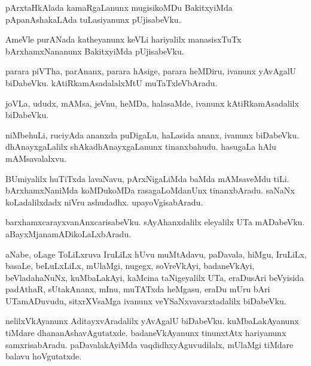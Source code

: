 \begin{mng}
pArxtaHkAlada kamaRgaLanunx mugisikoMDu BakitxyiMda pApanAshakaLAda tuLasiyanunx pUjisabeVku.
\end{mng}

\begin{mng}
AmeVle purANada katheyanunx keVLi hariyalilx manasisxTuTx bArxhamxNananunx BakitxyiMda pUjisabeVku.
\end{mng}

\begin{mng}
parara piVTha, parAnanx, parara hAsige, parara heMDiru, ivanunx yAvAgalU biDabeVku. kAtiRkamAsadalalxMtU muTaTxleVbAradu.
\end{mng}

\begin{mng}
joVLa, ududx, mAMsa, jeVnu, heMDa, halasaMde, ivanunx kAtiRkamAsadalilx biDabeVku.
\end{mng}

\begin{mng}
niMbehuLi, ruciyAda ananxda puDigaLu, haLasida ananx, ivanunx biDabeVku. dhAnayxgaLalilx shAkadhAnayxgaLanunx tinanxbahudu. hasugaLa hAlu mAMsavalalxvu.
\end{mng}

\begin{mng}
BUmiyalilx huTiTxda lavaNavu, pArxNigaLiMda baMda mAMsaveMdu tiLi. bArxhamxNaniMda koMDukoMDa rasagaLoMdanUnx tinanxbAradu. saNaNx koLadalilxdadx niVru ashudadhx. upayoVgisabAradu.
\end{mng}

\begin{mng}
barxhamxcarayxvanAnxcarisabeVku. sAyAhanxdalilx eleyalilx UTa mADabeVku. aBayxMjanamADikoLaLxbAradu.
\end{mng}

\begin{mng}
aNabe, oLage ToLiLxruva IruLiLx hUvu muMtAdavu, paDavala, hiMgu, IruLiLx, basaLe, beLuLxLiLx, mUlaMgi, nugegx, soVreVkAyi, badaneVkAyi, beVladahaNuNx, kuMbaLakAyi, kaMcina taNigeyalilx UTa, eraDusAri beVyisida padAthaR, sUtakAnanx, mInu, muTATxda heMgasu, eraDu mUru bAri UTamADuvudu, sitxrXVsaMga ivanunx veYSaNxvavarxtadalilx biDabeVku. 
\end{mng}

\begin{mng}
nelilxVkAyanunx AditayxvAradalilx yAvAgalU biDabeVku. kuMbaLakAyanunx tiMdare dhananAshavAgutatxde. badaneVkAyanunx tinunxtAtx hariyanunx samxrisabAradu. paDavalakAyiMda vaqdidhxyAguvudilalx, mUlaMgi tiMdare balavu hoVgutatxde.
\end{mng}


